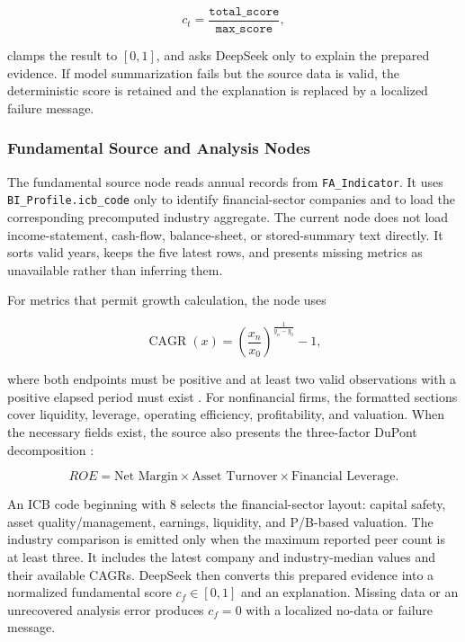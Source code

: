 \begin{equation}
    c_t = \frac{\texttt{total\_score}}{\texttt{max\_score}},
    \label{eq:technical-normalized-score}
\end{equation}

clamps the result to $[0,1]$, and asks DeepSeek only to explain the prepared evidence. If model summarization fails but the source data is valid, the deterministic score is retained and the explanation is replaced by a localized failure message.

\subsubsection{Fundamental Source and Analysis Nodes}
\label{subsubsec:fundamental-analysis-node}

The fundamental source node reads annual records from \texttt{FA\_Indicator}. It uses \texttt{BI\_Profile.icb\_code} only to identify financial-sector companies and to load the corresponding precomputed industry aggregate. The current node does not load income-statement, cash-flow, balance-sheet, or stored-summary text directly. It sorts valid years, keeps the five latest rows, and presents missing metrics as unavailable rather than inferring them.

For metrics that permit growth calculation, the node uses

\begin{equation}
    \operatorname{CAGR}(x) = \left(\frac{x_n}{x_0}\right)^{\frac{1}{y_n-y_0}} - 1,
    \label{eq:fundamental-cagr}
\end{equation}

where both endpoints must be positive and at least two valid observations with a positive elapsed period must exist \cite{damodaranHistoricalGrowth2026}. For nonfinancial firms, the formatted sections cover liquidity, leverage, operating efficiency, profitability, and valuation. When the necessary fields exist, the source also presents the three-factor DuPont decomposition \cite{openstaxDupont2022}:

\begin{equation}
    ROE = \text{Net Margin} \times \text{Asset Turnover} \times \text{Financial Leverage}.
    \label{eq:dupont-stockrium}
\end{equation}

An ICB code beginning with 8 selects the financial-sector layout: capital safety, asset quality/management, earnings, liquidity, and P/B-based valuation. The industry comparison is emitted only when the maximum reported peer count is at least three. It includes the latest company and industry-median values and their available CAGRs. DeepSeek then converts this prepared evidence into a normalized fundamental score $c_f\in[0,1]$ and an explanation. Missing data or an unrecovered analysis error produces $c_f=0$ with a localized no-data or failure message.

